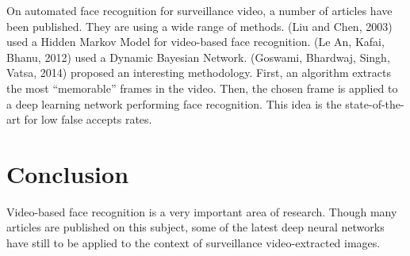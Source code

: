 On automated face recognition for surveillance video, a number of articles have been published. They are using a wide range of methods. (Liu and Chen, 2003) used a Hidden Markov Model for video-based face recognition. (Le An, Kafai, Bhanu, 2012) used a Dynamic Bayesian Network. (Goswami, Bhardwaj, Singh, Vatsa, 2014) proposed an interesting methodology. First, an algorithm extracts the most \enquote{memorable} frames in the video. Then, the chosen frame is applied to a deep learning network performing face recognition. This idea is the state-of-the-art for low false accepts rates.

\section{Conclusion}

Video-based face recognition is a very important area of research. Though many articles are published on this subject, some of the latest deep neural networks have still to be applied to the context of surveillance video-extracted images.